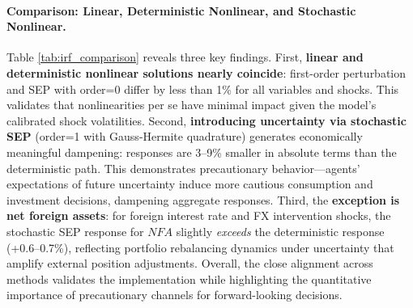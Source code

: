 \documentclass[12pt]{article}
\begin{document}
\paragraph{Comparison: Linear, Deterministic Nonlinear, and Stochastic Nonlinear.}
Table \ref{tab:irf_comparison} reveals three key findings. First, \textbf{linear and deterministic nonlinear solutions nearly coincide}: first-order perturbation and SEP with order=0 differ by less than 1\% for all variables and shocks. This validates that nonlinearities per se have minimal impact given the model's calibrated shock volatilities. Second, \textbf{introducing uncertainty via stochastic SEP} (order=1 with Gauss-Hermite quadrature) generates economically meaningful dampening: responses are 3--9\% smaller in absolute terms than the deterministic path. This demonstrates precautionary behavior---agents' expectations of future uncertainty induce more cautious consumption and investment decisions, dampening aggregate responses. Third, the \textbf{exception is net foreign assets}: for foreign interest rate and FX intervention shocks, the stochastic SEP response for $NFA$ slightly \emph{exceeds} the deterministic response (+0.6--0.7\%), reflecting portfolio rebalancing dynamics under uncertainty that amplify external position adjustments. Overall, the close alignment across methods validates the implementation while highlighting the quantitative importance of precautionary channels for forward-looking decisions.
\end{document}
